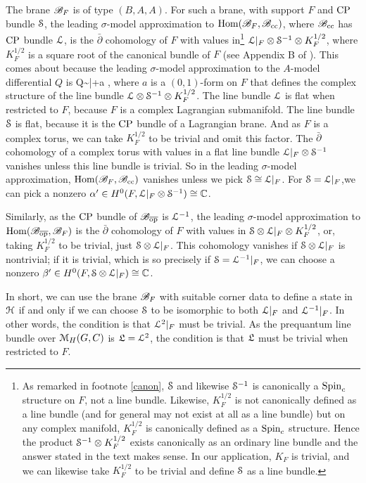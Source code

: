 \documentclass[11pt,a4paper]{article}
\begin{document}
The brane $\B_F$ is of type  $(B,A,A)$.  For such a brane, with support $F$ and $\CP$ bundle $\S$, the leading $\sigma$-model approximation to
$\Hom(\B_F,\B_\cc)$, where $\B_\cc$ has $\CP$ bundle $\L$, is the $\bar\partial$ cohomology of $F$ with values in\footnote{As remarked in footnote \ref{canon}, $\S$ and likewise
$\S^{-1}$ is canonically  a $\Spin_c$ structure on $F$, not a line bundle.   Likewise, $K_F^{1/2}$ is not canonically defined as a line bundle (and for general may not
exist at all as a line bundle) but on any complex manifold, $K_F^{1/2}$ is canonically defined as a $\Spin_c$ structure.   Hence the product $\S^{-1}\otimes
K_F^{1/2}$ exists canonically as an ordinary line bundle and the answer stated in the text makes sense.  In our application,
 $K_F$ is trivial, and we can likewise take $K_F^{1/2}$ to be trivial and define $\S$ as a line bundle.}  $\L|_F\otimes \S^{-1}\otimes K_F^{1/2}$,
where $K_F^{1/2}$ is a square root of the canonical bundle of $F$  (see Appendix B of \cite{GW}).   
This comes about because the leading $\sigma$-model approximation to the $A$-model
differential $Q$ is
\be\label{jno}Q\sim \bar\partial+a , \ee
where $a$ is a $(0,1)$-form on $F$ that defines the complex structure of the line bundle $\L\otimes \S^{-1}\otimes K_F^{1/2}$.   
The line bundle $\L$ is flat when restricted to $F$, because $F$ is a complex Lagrangian submanifold.  The line bundle $\S$ is flat, because it is the
$\CP$ bundle of a Lagrangian brane.   And as $F$ is a complex torus, we can take $K_F^{1/2}$ to be trivial and omit this factor.   The $\bar\partial$ cohomology
of a complex torus with values in a flat line bundle $\L|_F\otimes \S^{-1}$ vanishes unless this line bundle is trivial.   So in the leading $\sigma$-model approximation,
$\Hom(\B_F,\B_\cc)$ vanishes unless we pick $\S\cong \L|_F$.  For $\S=\L|_F$,we can pick a nonzero $\alpha' \in H^0(F,\L|_F\otimes \S^{-1})\cong \C$.

Similarly, as the $\CP$ bundle of $\B_\bop$ is $\L^{-1}$,
the leading $\sigma$-model approximation to $\Hom(\B_\bop,\B_F)$ is the $\bar\partial$ cohomology of $F$ with values in $\S\otimes \L|_F\otimes K_F^{1/2}$, or,
taking $K_F^{1/2}$ to be trivial, just $\S\otimes \L|_F$.
This cohomology vanishes if $\S\otimes \L|_F$ is nontrivial; if it is trivial, which is so precisely if $\S=\L^{-1}|_F$, we can choose a nonzero $\beta'\in H^0(F, \S\otimes\L|_F)\cong \C$.

In short, we can use the brane $\B_F$ with suitable corner data to define a state in $\H$ if and only if we can choose $\S$ to be isomorphic
to both $\L|_F$ and $\L^{-1}|_F$.    In other words, the condition is that $\L^2|_F$ must be trivial.   As the prequantum line bundle over  $\M_H(G,C)$
is $\frL=\L^2$, the condition is that $\frL$ must be trivial when restricted to $F$.
\end{document}

